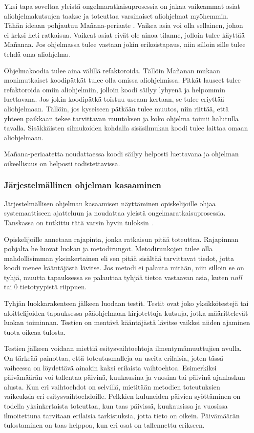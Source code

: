 Yksi tapa soveltaa yleistä ongelmaratkaisuprosessia on jakaa vaikeammat asiat
aliohjelmakutsujen taakse ja toteuttaa varsinaiset aliohjelmat myöhemmin. Tähän
ideaan pohjautuu Mañana-periaate \cite{Caspersen:2006:NPO:1176617.1176741}.
Vaikea asia voi olla sellainen, johon ei keksi heti ratkaisua. Vaikeat asiat
eivät ole ainoa tilanne, jolloin tulee käyttää Mañanaa. Jos ohjelmassa tulee
vastaan jokin erikoistapaus, niin silloin sille tulee tehdä oma aliohjelma.

Ohjelmakoodia tulee aina välillä refaktoroida. Tällöin Mañanan mukaan
monimutkaiset koodipätkät tulee olla omissa aliohjelmissa. Pitkät lauseet tulee
refaktoroida omiin aliohjelmiin, jolloin koodi säilyy lyhyenä ja helpommin
luettavana. Jos jokin koodipätkä toistuu useaan kertaan, se tulee eriyttää
aliohjelmaan. Tällöin, jos kyseiseen pätkään tulee muutos, niin riittää, että
yhteen paikkaan tekee tarvittavan muutoksen ja koko ohjelma toimii halutulla
tavalla. Sisäkkäisten silmukoiden kohdalla sisäsilmukan koodi tulee laittaa
omaan aliohjelmaan.

Mañana-periaatetta noudattaessa koodi säilyy helposti luettavana ja ohjelman
oikeellisuus on helposti todistettavissa.

\subsubsection{Järjestelmällinen ohjelman kasaaminen}

Järjestelmällisen ohjelman kasaamisen näyttäminen opiskelijoille ohjaa
systemaattiseen ajatteluun ja noudattaa yleistä ongelmaratkaisuprosessia.
Tanskassa on tutkittu tätä varsin hyvin tuloksin
\cite{Caspersen:2006:NPO:1176617.1176741}.

Opiskelijoille annetaan rajapinta, jonka ratkaisun pitää toteuttaa. Rajapinnan
pohjalta he luovat luokan ja metodirungot. Metodirunkojen tulee olla
mahdollisimman yksinkertainen eli sen pitää sisältää tarvittavat tiedot, jotta
koodi menee kääntäjästä lävitse. Jos metodi ei palauta mitään, niin silloin se
on tyhjä, muutta tapauksessa se palauttaa tyhjää tietoa vastaavan asia, kuten
$null$ tai $0$ tietotyypistä riippuen.

Tyhjän luokkarakenteen jälkeen luodaan testit. Testit ovat joko yksikkötestejä
tai aloittelijoiden tapauksessa pääohjelmaan kirjotettuja kutsuja, jotka
määrittelevät luokan toiminnan. Testien on mentävä kääntäjästä lävitse vaikkei
niiden ajaminen tuota oikeaa tulosta.

Testien jälkeen voidaan miettiä esitysvaihtoehtoja ilmentymämuuttujien avulla.
On tärkeää painottaa, että toteutusmalleja on useita erilaisia, joten tässä
vaiheessa on löydettävä ainakin kaksi erilaista vaihtoehtoa. Esimerkiksi
päivämäärän voi tallentaa päivinä, kuukausina ja vuosina tai päivinä ajanlaskun
alusta. Kun eri vaihtoehdot on selvillä, mietitään metodien toteutuksien
vaikeuksia eri esitysvaihtoehdoille. Pelkkien kuluneiden päivien syöttäminen on
todella yksinkertaista toteuttaa, kun taas päivissä, kuukausissa ja vuosissa
ilmoitettuna tarvitaan erilaisia tarkistuksia, jotta tieto on oikein.
Päivämäärän tulostaminen on taas helppoa, kun eri osat on tallennettu erikseen.

